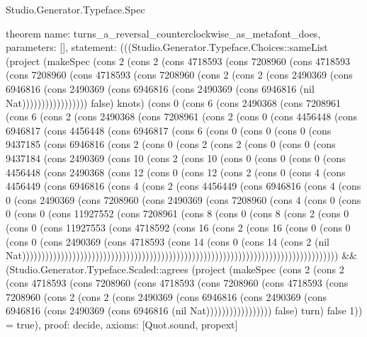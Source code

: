 \begin{lexlean}{Studio.Generator.Typeface.Spec}
\begin{semanticmodule}
theorem{
  name: turns_a_reversal_counterclockwise_as_metafont_does,
  parameters: [],
  statement: (((Studio.Generator.Typeface.Choices::sameList (project (makeSpec (cons 2 (cons 2 (cons 4718593 (cons 7208960 (cons 4718593 (cons 7208960 (cons 4718593 (cons 7208960 (cons 2 (cons 2 (cons 2490369 (cons 6946816 (cons 2490369 (cons 6946816 (cons 2490369 (cons 6946816 (nil Nat))))))))))))))))) false) knots) (cons 0 (cons 6 (cons 2490368 (cons 7208961 (cons 6 (cons 2 (cons 2490368 (cons 7208961 (cons 2 (cons 0 (cons 4456448 (cons 6946817 (cons 4456448 (cons 6946817 (cons 6 (cons 0 (cons 0 (cons 0 (cons 9437185 (cons 6946816 (cons 2 (cons 0 (cons 2 (cons 2 (cons 0 (cons 0 (cons 9437184 (cons 2490369 (cons 10 (cons 2 (cons 10 (cons 0 (cons 0 (cons 0 (cons 4456448 (cons 2490368 (cons 12 (cons 0 (cons 12 (cons 2 (cons 0 (cons 4 (cons 4456449 (cons 6946816 (cons 4 (cons 2 (cons 4456449 (cons 6946816 (cons 4 (cons 0 (cons 2490369 (cons 7208960 (cons 2490369 (cons 7208960 (cons 4 (cons 0 (cons 0 (cons 0 (cons 11927552 (cons 7208961 (cons 8 (cons 0 (cons 8 (cons 2 (cons 0 (cons 0 (cons 11927553 (cons 4718592 (cons 16 (cons 2 (cons 16 (cons 0 (cons 0 (cons 0 (cons 2490369 (cons 4718593 (cons 14 (cons 0 (cons 14 (cons 2 (nil Nat)))))))))))))))))))))))))))))))))))))))))))))))))))))))))))))))))))))))))))))))))) && (Studio.Generator.Typeface.Scaled::agrees (project (makeSpec (cons 2 (cons 2 (cons 4718593 (cons 7208960 (cons 4718593 (cons 7208960 (cons 4718593 (cons 7208960 (cons 2 (cons 2 (cons 2490369 (cons 6946816 (cons 2490369 (cons 6946816 (cons 2490369 (cons 6946816 (nil Nat))))))))))))))))) false) turn) false 1)) = true),
  proof: decide{},
  axioms: [Quot.sound, propext]
}


\end{semanticmodule}
\end{lexlean}
